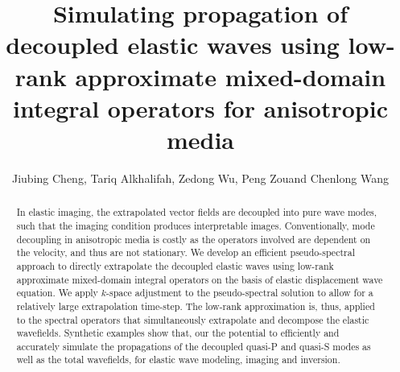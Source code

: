 
\title{Simulating propagation of decoupled elastic waves using low-rank approximate mixed-domain integral operators for anisotropic media}

\author{
Jiubing Cheng\footnotemark[1], Tariq Alkhalifah\footnotemark[2], Zedong Wu\footnotemark[3], Peng Zou\footnotemark[4] and Chenlong Wang\footnotemark[5]
}

\address{
\footnotemark[1] Tongji University, State Key Laboratory of Marine Geology, Shanghai, China. E-mail: cjb1206@tongji.edu.cn \\
\footnotemark[2] King Abdullah University of Science and Technology, Thuwal, Saudi Arabia. E-mail: tariq.alkhalifah@kaust.edu.sa \\
\footnotemark[3] King Abdullah University of Science and Technology, Thuwal, Saudi Arabia. E-mail: zedong.wu@kaust.edu.sa \\
\footnotemark[4] Tongji University, Shanghai, China. E-mail: 1533006@tongji.edu.cn \\
\footnotemark[5] Tongji University, Shanghai, China. E-mail: skoltyz.10000@163.com 
}


\maketitle

\begin{abstract}
	In elastic imaging, the extrapolated vector fields are decoupled
	into pure wave modes, such that the imaging condition produces interpretable
	images.
	Conventionally, mode decoupling in anisotropic media is costly as
	the operators involved are dependent on the velocity, and thus are not stationary.
	We develop an efficient pseudo-spectral approach to directly extrapolate
	the decoupled elastic waves using low-rank approximate
	mixed-domain integral operators on the basis of  elastic displacement wave equation.
	We apply $k$-space adjustment to the pseudo-spectral solution to allow for
	a relatively large extrapolation time-step. 
	The low-rank approximation is, thus, applied to the spectral operators that
	simultaneously extrapolate and decompose the elastic wavefields.
    Synthetic examples 
	show that, our  the potential to efficiently and
	accurately simulate the propagations of the decoupled quasi-P and quasi-S
	modes as well as the total wavefields, for elastic wave modeling, imaging
	and inversion.
\end{abstract}

